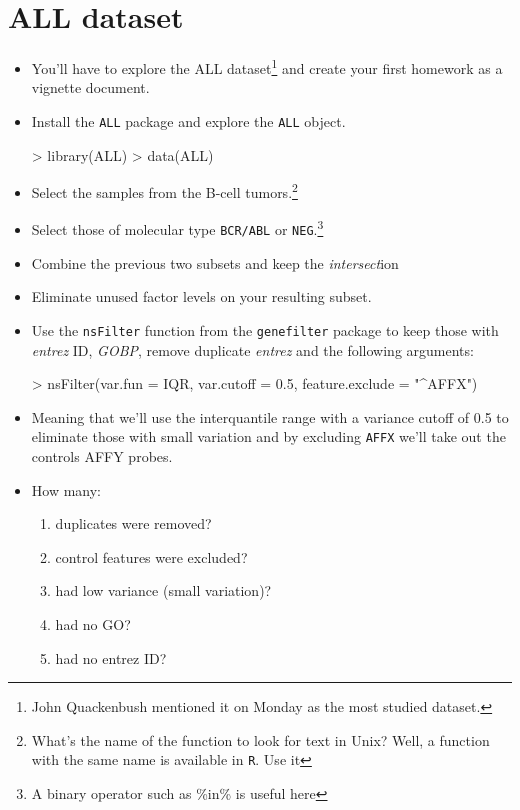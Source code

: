 \documentclass[letterpaper,12pt]{article}
\newcommand{\pl}[1]{\texttt{#1}}
\begin{document}
\section{ALL dataset}
  \begin{itemize}
  \item You'll have to explore the ALL dataset\footnote{John Quackenbush mentioned it on Monday as the most studied dataset.} and create your first homework as a vignette document.
  \item Install the \pl{ALL} package and explore the \pl{ALL} object.
\begin{Schunk}
\begin{Sinput}
> library(ALL)
> data(ALL)
\end{Sinput}
\end{Schunk}
  \item Select the samples from the B-cell tumors.\footnote{What's the name of the function to look for text in Unix? Well, a function with the same name is available in \pl{R}. Use it}
  \item Select those of molecular type \pl{BCR/ABL} or \pl{NEG}.\footnote{A binary operator such as \%in\% is useful here}
  \item Combine the previous two subsets and keep the \emph{intersect}ion
  \item Eliminate unused factor levels on your resulting subset.
  \item Use the \pl{nsFilter} function from the \pl{genefilter} package to keep those with \emph{entrez} ID, \emph{GOBP}, remove duplicate \emph{entrez} and the following arguments:
\begin{Schunk}
\begin{Sinput}
> nsFilter(var.fun = IQR, var.cutoff = 0.5, feature.exclude = "^AFFX")
\end{Sinput}
\end{Schunk}
  \item Meaning that we'll use the interquantile range with a variance cutoff of 0.5 to eliminate those with small variation and by excluding \pl{AFFX} we'll take out the controls AFFY probes.
  \item How many:
  \begin{enumerate}
  \item duplicates were removed?
  \item control features were excluded?
  \item had low variance (small variation)?
  \item had no GO?
  \item had no entrez ID?
  \end{enumerate}
  \end{itemize}
\end{document}

